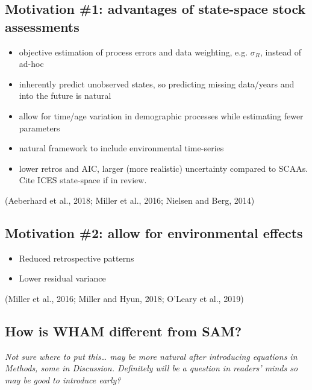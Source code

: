 \documentclass[]{article}
\providecommand{\tightlist}{%
  \setlength{\itemsep}{0pt}\setlength{\parskip}{0pt}}
\begin{document}
\hypertarget{motivation-1-advantages-of-state-space-stock-assessments}{%
\subsection{Motivation \#1: advantages of state-space stock
assessments}\label{motivation-1-advantages-of-state-space-stock-assessments}}

\begin{itemize}
\tightlist
\item
  objective estimation of process errors and data weighting, e.g.
  \(\sigma_R\), instead of ad-hoc
\item
  inherently predict unobserved states, so predicting missing data/years
  and into the future is natural
\item
  allow for time/age variation in demographic processes while estimating
  fewer parameters
\item
  natural framework to include environmental time-series
\item
  lower retros and AIC, larger (more realistic) uncertainty compared to
  SCAAs. Cite ICES state-space if in review.
\end{itemize}

(Aeberhard et al., 2018; Miller et al., 2016; Nielsen and Berg, 2014)

\hypertarget{motivation-2-allow-for-environmental-effects}{%
\subsection{Motivation \#2: allow for environmental
effects}\label{motivation-2-allow-for-environmental-effects}}

\begin{itemize}
\tightlist
\item
  Reduced retrospective patterns
\item
  Lower residual variance
\end{itemize}

(Miller et al., 2016; Miller and Hyun, 2018; O'Leary et al., 2019)

\hypertarget{how-is-wham-different-from-sam}{%
\subsection{How is WHAM different from
SAM?}\label{how-is-wham-different-from-sam}}

\emph{Not sure where to put this\ldots{} may be more natural after
introducing equations in Methods, some in Discussion. Definitely will be
a question in readers' minds so may be good to introduce early?}
\end{document}
